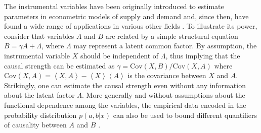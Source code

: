 \documentclass[letterpaper]{article}
\newcommand{\mean}[1]{\left\langle #1 \right\rangle}
\begin{document}
The instrumental variables have been originally introduced to estimate parameters
in econometric models of supply and demand \cite{economic} and, since then, have found a
wide range of applications in various other fields \cite{economic2, economic3}. To illustrate its
power, consider that variables $A$ and $B$ are related by a simple structural
equation $B=\gamma A +\Lambda$, where $\Lambda$ may represent a latent common
factor. By assumption, the instrumental variable $X$ should be independent of
$\Lambda$, thus implying that the causal strength can be estimated as $\gamma=
\mathrm{Cov}(X,B)/\mathrm{Cov}(X,A)$ where $\mathrm{Cov}(X,A)= \mean{X,A} -
\mean{X}\mean{A}$ is the covariance between $X$ and $A$. Strikingly, one can
estimate the causal strength even without any information about the latent
factor $\Lambda$. More generally and without assumptions about the functional
dependence among the variables, the empirical data encoded in the probability
distribution $p(a,b \vert x)$ can also be used to bound different quantifiers of
causality between $A$ and $B$ \cite{}.


\end{document}
